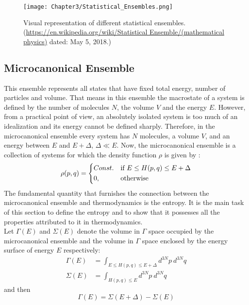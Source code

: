 \begin{figure}[h!]
\centering
\texttt{[image: Chapter3/Statistical\_Ensembles.png]}
\caption[Visual representation of different statistical ensembles.]{Visual representation of different statistical ensembles. (\url{https://en.wikipedia.org/wiki/Statistical Ensemble/(mathematical physics)} dated: May 5, 2018.)}
\end{figure}

\subsection{Microcanonical Ensemble} 
This ensemble represents all states that have fixed total energy, number of particles and volume. That means in this ensemble the macrostate of a system is defined by the number of molecules $N$, the volume $V$ and the energy $E$. However, from a practical point of view, an absolutely isolated system is too much of an idealization and its energy cannot be defined sharply.  Therefore, in the microcanonical ensemble every system has $N$ molecules, a volume $V$, and an energy between $E$ and $E + \Delta$, $\Delta \ll  E $. Now, the microcanonical ensemble is a collection of systems for which the density function $\rho $  is given by \citep{huang2009, pathria1996}:
\begin{eqnarray}
\rho (p,q)= \begin{dcases}
    Const. & \text{if }  E \leq H(p,q)\leq  E+ \Delta \\
    0,              & \text{otherwise}
\end{dcases} 
\end{eqnarray}
The fundamental quantity that furnishes the connection between the microcanonical ensemble and thermodynamics is the entropy. It is the main task of this section to define the entropy and to show that it possesses all the properties attributed to it in thermodynamics.\\
Let $\Gamma(E) $  and  $\Sigma (E)$  denote the volume in $\Gamma $ space occupied by the microcanonical ensemble and  the volume in $\Gamma $ space enclosed by the energy surface of energy $E$ respectively: 
\begin{align}
\Gamma(E) &= \int_{E \leq H(p, q)\leq  E+ \Delta} d^{3N}p~ d^{3N}q  \\
\Sigma (E) & = \int_{ H(p, q)\leq  E } d^{3N}p~ d^{3N}q 
\end{align} and then 
\begin{equation}
\Gamma(E) = \Sigma (E + \Delta ) - \Sigma (E) 
\end{equation}
